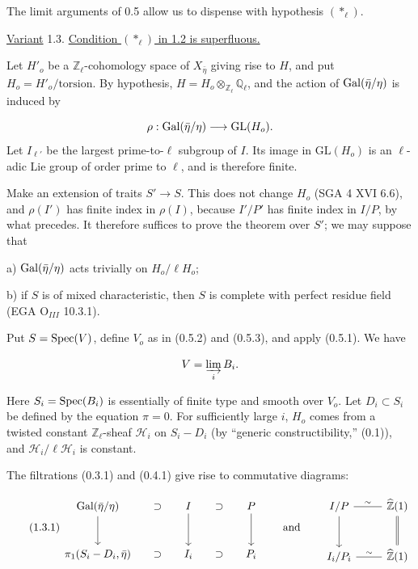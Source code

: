 The limit arguments of 0.5 allow us to dispense with hypothesis $(*_\ell)$.

\underline{Variant} 1.3. \underline{Condition $(*_\ell)$ in 1.2 is superfluous.}

Let $H'_o$ be a $\mathbb{Z}_\ell$-cohomology space of $X_{\bar\eta}$ giving rise to $H$, and put $H_o=H'_o/\text{torsion}$. By hypothesis,
$H=H_o\otimes_{\mathbb{Z}_\ell}\mathbb{Q}_\ell$, and the action of $\operatorname{Gal}(\bar\eta/\eta)$ is induced by

\begin{equation*}
\rho:\operatorname{Gal}(\bar\eta/\eta)\longrightarrow\mathrm{GL}(H_o).
\end{equation*}
Let $I_{\ell'}$ be the largest prime-to-$\ell$ subgroup of $I$. Its image in $\mathrm{GL}(H_o)$ is an $\ell$-adic Lie group of order prime to $\ell$, and is therefore finite.

Make an extension of traits $S'\longrightarrow S$. This does not change $H_o$ (SGA 4 XVI 6.6), and $\rho(I')$ has finite index in $\rho(I)$, because $I'/P'$ has finite index in $I/P$, by what precedes. It therefore suffices to prove the theorem over $S'$; we may suppose that

a) $\operatorname{Gal}(\bar\eta/\eta)$ acts trivially on $H_o/\ell H_o$;

b) if $S$ is of mixed characteristic, then $S$ is complete with perfect residue field (EGA $\mathrm{O}_{III}$ 10.3.1).

Put $S=\operatorname{Spec}(V)$, define $V_o$ as in (0.5.2) and (0.5.3), and apply (0.5.1). We have

\begin{equation*}
V=\varinjlim_i B_i.
\end{equation*}


Here $S_i=\operatorname{Spec}(B_i)$ is essentially of finite type and smooth over $V_o$. Let $D_i\subset S_i$ be defined by the equation $\pi=0$. For sufficiently large $i$, $H_o$ comes from a twisted constant $\mathbb{Z}_\ell$-sheaf $\mathcal H_i$ on $S_i-D_i$ (by ``generic constructibility,'' (0.1)), and $\mathcal H_i/\ell\mathcal H_i$ is constant.

The filtrations (0.3.1) and (0.4.1) give rise to commutative diagrams:

\begin{equation}\tag{1.3.1}
\begin{tikzcd}[column sep=small,row sep=large]
\Gal(\bar\eta/\eta) \arrow[d] & \supset & I \arrow[d] & \supset & P \arrow[d] \\
\pi_1(S_i-D_i,\bar\eta) & \supset & I_i & \supset & P_i
\end{tikzcd}
\qquad\text{and}\qquad
\begin{tikzcd}[row sep=large]
I/P \arrow[r,dash,"\sim"] \arrow[d] & \widehat{\mathbb Z}(1) \arrow[d,equal] \\
I_i/P_i \arrow[r,dash,"\sim"] & \widehat{\mathbb Z}(1)
\end{tikzcd}
\end{equation}

